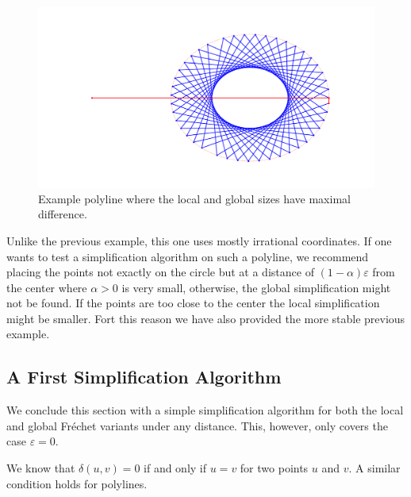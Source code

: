 \begin{figure}[h!tbp]
  \centering
	\includegraphics[scale=0.3]{./figures/local-global-mostdiff.png}
	\caption{Example polyline where the local and global sizes have maximal difference.}
  \label{fig:local-global-mostdiff}
\end{figure}

Unlike the previous example, this one uses mostly irrational coordinates. If one wants to test a simplification algorithm on such a polyline, we recommend placing the points not exactly on the circle but at a distance of \((1-\alpha)\varepsilon\) from the center where \(\alpha > 0\) is very small, otherwise, the global simplification might not be found. If the points are too close to the center the local simplification might be smaller. Fort this reason we have also provided the more stable previous example.

\subsection{A First Simplification Algorithm}
We conclude this section with a simple simplification algorithm for both the local and global Fréchet variants under any distance. This, however, only covers the case \(\varepsilon = 0\).

We know that \(\delta(u, v) = 0\) if and only if \(u = v\) for two points \(u\) and \(v\). A similar condition holds for polylines.

